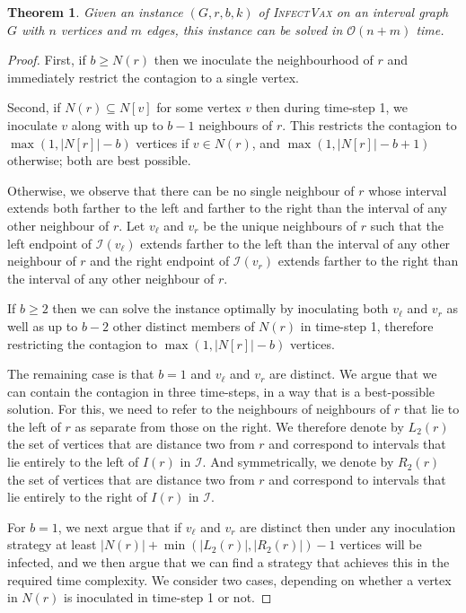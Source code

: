 \documentclass[unknownkeysallowed]{article}
\newtheorem{theorem}{Theorem}[section]
\theoremstyle{definition}\newtheorem{strategy}{Strategy}
\theoremstyle{definition}\newtheorem{notation}{Notation}[theorem]
\newcommand*{\IV}{\textup{\textsc{InfectVax}}\xspace}
\begin{document}
\begin{theorem}\label{thm:iv-interval}
Given an instance $(G,r,b,k)$ of \IV on an interval graph $G$ with $n$ vertices and $m$ edges, this instance can be solved in $\mathcal{O}(n+m)$ time.
\end{theorem}


\begin{proof}
First, if $b \geq N(r)$ then we inoculate the neighbourhood of $r$ and immediately restrict the contagion to a single vertex.  

Second, if $N(r) \subseteq N[v]$ for some vertex $v$ then during time-step 1, we inoculate $v$ along with up to $b-1$ neighbours of $r$.  This restricts the contagion to  $\max(1,|N[r]|-b)$ vertices if $v \in N(r)$, and $\max(1,|N[r]|-b+1)$ otherwise; both are best possible.

Otherwise, we observe that there can be no single neighbour of $r$ whose interval extends both farther to the left and farther to the right than the interval of any other neighbour of $r$. Let $v_\ell$ and $v_r$ be the unique neighbours of $r$ such that the left endpoint of $\mathcal{I}(v_\ell)$ extends farther to the left than the interval of any other neighbour of $r$ and the right endpoint of $\mathcal{I}(v_r)$ extends farther to the right than the interval of any other neighbour of $r$.

If $b \geq 2$ then we can solve the instance optimally by inoculating both $v_\ell$ and $v_r$ as well as up to $b-2$ other distinct members of $N(r)$ in time-step 1, therefore restricting the contagion to $\max(1,|N[r]|-b)$ vertices.

The remaining case is that $b=1$ and $v_\ell$ and $v_r$ are distinct. We argue that we can contain the contagion in three time-steps, in a way that is a best-possible solution. For this, we need to refer to the neighbours of neighbours of $r$ that lie to the left of $r$ as separate from those on the right.  We therefore denote by $L_2(r)$ the set of vertices that are distance two from $r$ and correspond to intervals that lie entirely to the left of $I(r)$ in $\mathcal{I}$. And symmetrically, we denote by $R_2(r)$ the set of vertices that are distance two from $r$ and correspond to intervals that lie entirely to the right of $I(r)$ in $\mathcal{I}$.

For $b=1$, we next argue that if $v_\ell$ and $v_r$ are distinct then under any inoculation strategy at least $|N(r)| + \min(|L_2(r)|, |R_2(r)|) -1$ vertices will be infected, and we then argue that we can find a strategy that achieves this in the required time complexity. We consider two cases, depending on whether a vertex in $N(r)$ is inoculated in time-step 1 or not.


\end{proof}
\end{document}
